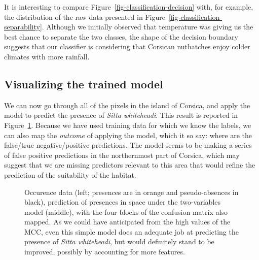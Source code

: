 \documentclass[
  letterpaper,
]{scrbook}
\begin{document}

It is interesting to compare Figure~\ref{fig-classification-decision}
with, for example, the distribution of the raw data presented in
Figure~\ref{fig-classification-separability}. Although we initially
observed that temperature was giving us the best chance to separate the
two classes, the shape of the decision boundary suggests that our
classifier is considering that Corsican nuthatches enjoy colder climates
with more rainfall.

\subsection{Visualizing the trained
model}\label{visualizing-the-trained-model}

We can now go through all of the pixels in the island of Corsica, and
apply the model to predict the presence of \emph{Sitta whiteheadi}. This
result is reported in Figure~\ref{fig-classification-range}. Because we
have used training data for which we know the labels, we can also map
the \emph{outcome} of applying the model, which it so say: where are the
false/true negative/positive predictions. The model seems to be making a
series of false positive predictions in the northernmost part of
Corsica, which may suggest that we are missing predictors relevant to
this area that would refine the prediction of the suitability of the
habitat.

\begin{figure}[pbt]


\caption{\label{fig-classification-range}Occurence data (left; presences
are in orange and pseudo-absences in black), prediction of presences in
space under the two-variables model (middle), with the four blocks of
the confusion matrix also mapped. As we could have anticipated from the
high values of the MCC, even this simple model does an adequate job at
predicting the presence of \emph{Sitta whiteheadi}, but would definitely
stand to be improved, possibly by accounting for more features.}

\end{figure}%
\end{document}
